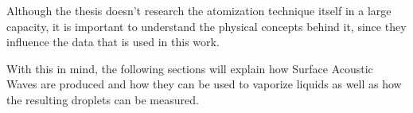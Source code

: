 Although the thesis doesn't research the atomization technique itself in a large capacity, it is important to understand the physical concepts behind it, since they influence the data that is used in this work.

With this in mind, the following sections will explain how Surface Acoustic Waves are produced and how they can be used to vaporize liquids as well as how the resulting droplets can be measured.